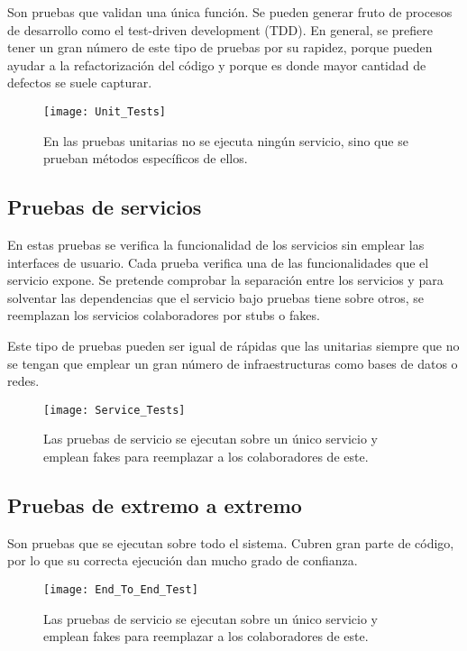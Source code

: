 \documentclass[11pt,a4paper]{article}
\begin{document}
Son pruebas que validan una única función. Se pueden generar fruto de procesos de desarrollo como el test-driven development (TDD). En general, se prefiere tener un gran número de este tipo de pruebas por su rapidez, porque pueden ayudar a la refactorización del código y porque es donde mayor cantidad de defectos se suele capturar.

\begin{figure}[H]
\centering
\texttt{[image: Unit\_Tests]}
\caption{En las pruebas unitarias no se ejecuta ningún servicio, sino que se prueban métodos específicos de ellos.}
\end{figure}

\subsection{Pruebas de servicios}

En estas pruebas se verifica la funcionalidad de los servicios sin emplear las interfaces de usuario. Cada prueba verifica una de las funcionalidades que el servicio expone. Se pretende comprobar la separación entre los servicios y para solventar las dependencias que el servicio bajo pruebas tiene sobre otros, se reemplazan los servicios colaboradores por stubs o fakes.

Este tipo de pruebas pueden ser igual de rápidas que las unitarias siempre que no se tengan que emplear un gran número de infraestructuras como bases de datos o redes.

\begin{figure}[h]
\centering
\texttt{[image: Service\_Tests]}
\caption{Las pruebas de servicio se ejecutan sobre un único servicio y emplean fakes para reemplazar a los colaboradores de este.}
\end{figure}

\subsection{Pruebas de extremo a extremo}

Son pruebas que se ejecutan sobre todo el sistema. Cubren gran parte de código, por lo que su correcta ejecución dan mucho grado de confianza.

\begin{figure}[h]
\centering
\texttt{[image: End\_To\_End\_Test]}
\caption{Las pruebas de servicio se ejecutan sobre un único servicio y emplean fakes para reemplazar a los colaboradores de este.}
\end{figure}
\end{document}
